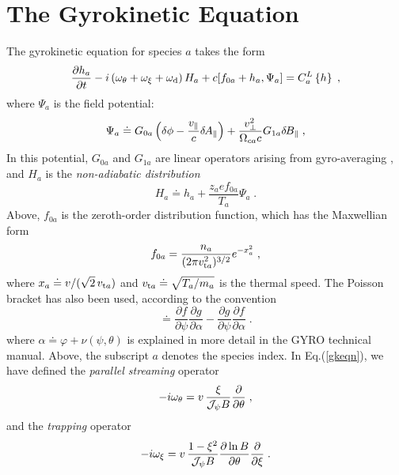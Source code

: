 \documentclass[11pt]{article}
\begin{document}
\section{The Gyrokinetic Equation}

The gyrokinetic equation for species $a$ takes the form
%
\begin{equation}
\frac{\partial h_a}{\partial t}
- i \left( \omega_{\theta} + \omega_{\rm \xi} + \omega_{\rm d} \right) H_a
  + c [f_{0a} + h_a , \Psi_a ] = C_a^{L}\left\{h\right\} \; ,
\label{gkeqn}
\end{equation}
%
where $\Psi_a$ is the field potential:
%
\begin{equation}
\Psi_a \doteq G_{0a} \left( \delta \phi - \frac{v_\parallel}{c} \delta \hskip -1pt A_\parallel \right)
         + \frac{v_\perp^2}{\Omega_{ca} c} G_{1a} \delta \hskip -1pt B_\parallel \; ,
\end{equation}
%
In this potential, $G_{0a}$ and $G_{1a}$ are linear operators arising from 
gyro-averaging \cite{sugama:1998}, and $H_a$ is the {\sl non-adiabatic distribution} 
%
\begin{equation}
H_a \doteq h_a + \frac{z_a e f_{0a}}{T_a} \Psi_a \; .
\end{equation}
%
Above, $f_{0a}$ is the zeroth-order distribution function, which has the 
Maxwellian form
%
\begin{equation}
f_{0a} = \frac{n_a}{(2 \pi v_{{\rm t}a}^2)^{3/2}} e^{-x_a^2} \; ,
\end{equation}
%
where $x_a \doteq v/(\sqrt{2} \, v_{{\rm t}a})$ and $v_{{\rm t}a} \doteq \sqrt{T_a/m_a}$ 
is the thermal speed.  The Poisson bracket has also been used, according 
to the convention
%
\begin{equation}
[f,g] \doteq 
 \frac{\partial f}{\partial \psi}\frac{\partial g}{\partial \alpha} 
-\frac{\partial g}{\partial \psi}\frac{\partial f}{\partial \alpha} \; .
\end{equation}
%
where $\alpha \doteq \varphi + \nu(\psi,\theta)$ is explained in more detail 
in the GYRO technical manual.
Above, the subscript $a$ denotes the species index.  In Eq.(\ref{gkeqn}), we 
have defined the {\sl parallel streaming} operator
%
\begin{equation}
-i \omega_{\theta} = v \, \frac{\xi}{{\cal J}_\psi B}  
\frac{\partial}{\partial \theta} \; ,
\end{equation}
%
and the {\sl trapping} operator
%
\begin{equation}
-i \omega_{\xi} = v \, \frac{1-\xi^2}{{\cal J}_\psi B} 
\frac{\partial \ln B}{\partial \theta}
  \frac{\partial}{\partial \xi} \; . 
\end{equation}
\end{document}
